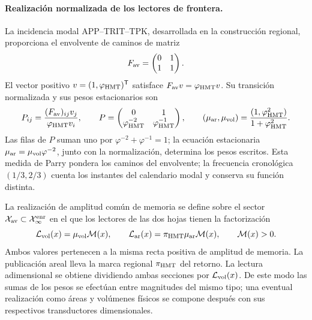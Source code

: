 \paragraph{Realización normalizada de los lectores de frontera.}
La incidencia modal APP--TRIT--TPK, desarrollada en la construcción
regional, proporciona el envolvente de caminos de matriz
\[
 F_{\rm av}=\begin{pmatrix}0&1\\1&1\end{pmatrix}.
\]
El vector positivo \(v=(1,\varphi_{\rm HMT})^{\mathsf T}\)
satisface \(F_{\rm av}v=\varphi_{\rm HMT}v\). Su transición
normalizada y sus pesos estacionarios son
\begin{equation}
 P_{ij}=\frac{(F_{\rm av})_{ij}v_j}{\varphi_{\rm HMT}v_i},
 \qquad
 P=\begin{pmatrix}0&1\\
 \varphi_{\rm HMT}^{-2}&\varphi_{\rm HMT}^{-1}\end{pmatrix},
 \qquad
 (\mu_{\rm ar},\mu_{\rm vol})
 =\frac{(1,\varphi_{\rm HMT}^{2})}{1+\varphi_{\rm HMT}^{2}}.
 \label{vii:eq:lectores-parry}
\end{equation}
Las filas de \(P\) suman uno por
\(\varphi^{-2}+\varphi^{-1}=1\); la ecuación estacionaria
\(\mu_{\rm ar}=\mu_{\rm vol}\varphi^{-2}\), junto con la
normalización, determina los pesos escritos. Esta medida de Parry
pondera los caminos del envolvente; la frecuencia cronológica
\((1/3,2/3)\) cuenta los instantes del calendario modal y conserva
su función distinta.

La realización de amplitud común de memoria se define sobre el sector
\(\mathcal X_{\rm av}\subset\mathcal X_\infty^{\rm enr}\) en el que
los lectores de las dos hojas tienen la factorización
\begin{equation}
 \mathcal L_{\rm vol}(x)=\mu_{\rm vol}\mathcal M(x),\qquad
 \mathcal L_{\rm ar}(x)=\pi_{\rm HMT}\mu_{\rm ar}\mathcal M(x),
 \qquad \mathcal M(x)>0.
 \label{vii:eq:lectores-amplitud-comun}
\end{equation}
Ambos valores pertenecen a la misma recta positiva de amplitud de
memoria. La publicación areal lleva la marca regional
\(\pi_{\rm HMT}\) del retorno. La lectura adimensional se obtiene
dividiendo ambas secciones por \(\mathcal L_{\rm vol}(x)\).
De este modo las sumas de los pesos se efectúan entre magnitudes del
mismo tipo; una eventual realización como áreas y volúmenes físicos
se compone después con sus respectivos transductores dimensionales.

